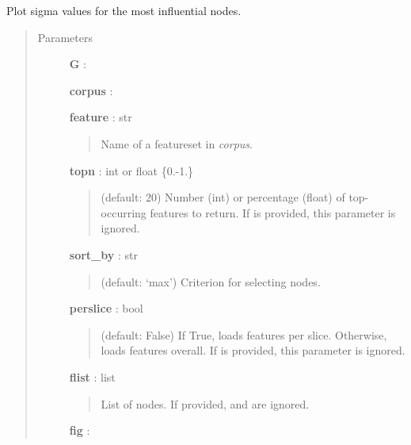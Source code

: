 \documentclass[letterpaper,10pt,english]{sphinxmanual}
\begin{document}
\begin{fulllineitems}
\label{tethne.analyze.corpus:tethne.analyze.corpus.plot_sigma}
Plot sigma values for the  most influential nodes.
\begin{quote}\begin{description}
\item[{Parameters}] \leavevmode
\textbf{G} : {\hyperref[tethne.classes.graphcollection:tethne.classes.graphcollection.GraphCollection]{}}

\textbf{corpus} : {\hyperref[tethne.classes.corpus:tethne.classes.corpus.Corpus]{}}

\textbf{feature} : str
\begin{quote}

Name of a featureset in \emph{corpus}.
\end{quote}

\textbf{topn} : int or float \{0.-1.\}
\begin{quote}

(default: 20) Number (int) or percentage (float) of top-occurring 
features to return. If  is provided, this parameter is ignored.
\end{quote}

\textbf{sort\_by} : str
\begin{quote}

(default: `max') Criterion for selecting  nodes.
\end{quote}

\textbf{perslice} : bool
\begin{quote}

(default: False) If True, loads  features per slice. Otherwise,
loads  features overall. If  is provided, this
parameter is ignored.
\end{quote}

\textbf{flist} : list
\begin{quote}

List of nodes. If provided,  and  are ignored.
\end{quote}

\textbf{fig} : 
\begin{quote}


\end{quote}
\end{description}
\end{quote}
\end{fulllineitems}
\end{document}

